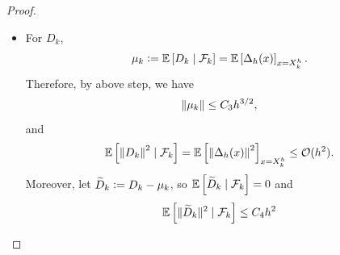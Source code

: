 \begin{proof}
\begin{itemize}
\begin{equation*}
        \end{equation*}
        On the other hand, by the global Lipschitz continuity of $\Pi$,
        \begin{equation*}
            G_k - \E\bj{G_k \mid \mathcal{F}_k} =  (\Pi(X^h_k) - \Pi(Y^h_k))\Delta W_k~\Rightarrow~ \E\bj{\norm{G_k - \E\bj{G_k \mid \mathcal{F}_k}}^2 \mid \mathcal{F}_k} \leq L_2h \norm{e_k}^2.
        \end{equation*}
        Therefore, 
        \begin{align*}
            \E\bj{\norm{G_k}^2 \mid \mathcal{F}_k} &= \norm{\E\bj{G_k \mid \mathcal{F}_k}}^2 + \E\bj{\norm{G_k - \E\bj{G_k \mid \mathcal{F}_k}}^2 \mid \mathcal{F}_k} \\
            &\leq (1 + C_2h) \norm{e_k}^2
        \end{align*}

        \item For $D_k$,
        \begin{equation*}
            \mu_k \vcentcolon= \mathbb{E}\left[D_k \mid \mathcal{F}_k\right] = \mathbb{E}\left[\Delta_h(x)\right]_{x = X^h_k}.
        \end{equation*}
        Therefore, by above step, we have
        \begin{equation*}
            \left\lVert\mu_k\right\lVert \leq C_3h^{3/2},
        \end{equation*}
        and
        \begin{equation*}
            \mathbb{E}\left[\left\lVert D_k\right\lVert^2 \mid \mathcal{F}_k\right] = \mathbb{E}\left[\left\lVert\Delta_h(x)\right\lVert^2\right]_{x = X^h_k} \leq \mathcal{O}(h^2).
        \end{equation*}
        Moreover, let $\widetilde{D}_k \vcentcolon= D_k - \mu_k$, so $\mathbb{E}\left[\widetilde{D}_k \mid \mathcal{F}_k\right] = 0$ and
        \begin{equation*}
            \mathbb{E}\left[\|\widetilde{D}_k\|^2 \mid \mathcal{F}_k\right] \leq C_4 h^2
        \end{equation*}


\end{itemize}
\end{proof}
